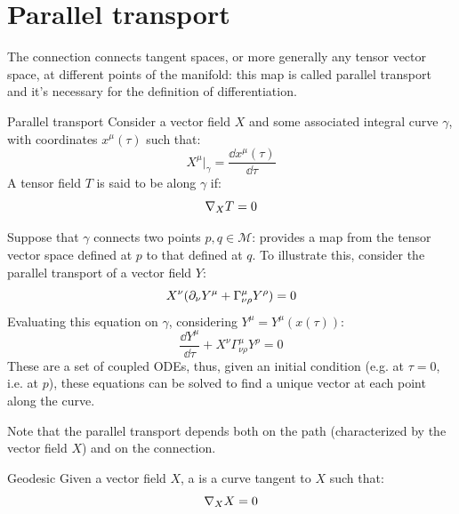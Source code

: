 \newpage
\section{Parallel transport}

The connection connects tangent spaces, or more generally any tensor vector space, at different points of the manifold: this map is called parallel transport and it's necessary for the definition of differentiation.

\begin{definition}{Parallel transport}{}
  Consider a vector field $ X $ and some associated integral curve $ \gamma $, with coordinates $ x^\mu(\tau) $ such that:
  \begin{equation*}
    X^\mu \big\vert_\gamma = \frac{\dd x^\mu(\tau)}{\dd \tau}
  \end{equation*}
  A tensor field $ T $ is said to be  along $ \gamma $ if:
  \begin{equation}
    \nabla_X T = 0
    \label{eq:parallel-transport}
  \end{equation}
\end{definition}

Suppose that $ \gamma $ connects two points $ p,q \in \mathcal{M} $:  provides a map from the tensor vector space defined at $ p $ to that defined at $ q $. To illustrate this, consider the parallel transport of a vector field $ Y $:
\begin{equation*}
  X^\nu (\partial_\nu Y^\mu + \Gamma^\mu_{\nu \rho} Y^\rho) = 0
\end{equation*}
Evaluating this equation on $ \gamma $, considering $ Y^\mu = Y^\mu(x(\tau)) $:
\begin{equation}
  \frac{\dd Y^\mu}{\dd \tau} + X^\nu \Gamma^\mu_{\nu \rho} Y^\rho = 0
\end{equation}
These are a set of coupled ODEs, thus, given an initial condition (e.g. at $ \tau = 0 $, i.e. at $ p $), these equations can be solved to find a unique vector at each point along the curve.

Note that the parallel transport depends both on the path (characterized by the vector field $ X $) and on the connection.

\begin{definition}{Geodesic}{}
  Given a vector field $ X $, a  is a curve tangent to $ X $ such that:
  \begin{equation}
    \nabla_X X = 0
    \label{eq:geodesic-def}
  \end{equation}
\end{definition}

